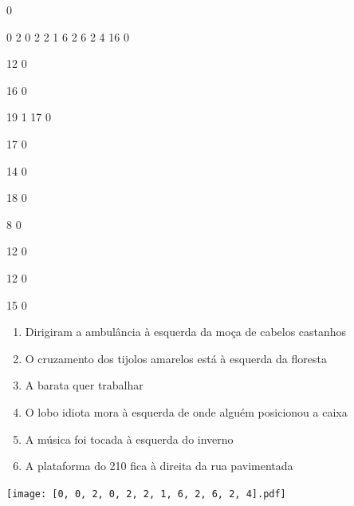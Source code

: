 \documentclass[12pt]{article}
\begin{document}
		\vfill  
		  
{
	0	%

	0	%
	2	%
	0	%
	2	%
	2	%
	1	%
	6	%
	2	%
	6	%
	2	%
	4	%
	16	%
	0	%

	12	%
	0	%

	16	%
	0	%

	19	%
	1	%
	17	%
	0	%

	17	%
	0	%

	14	%
	0	%

	18	%
	0	%

	8	%
	0	%

	12	%
	0	%

	12	%
	0	%

	15	%
	0	%

}	  
		    	

		 

\pagebreak


	\begin{enumerate}
		  \sffamily %
		  \large %


\vfill \item
Dirigiram a ambulância	%
à esquerda
da moça de cabelos castanhos	%

\vfill \item
O cruzamento dos tijolos amarelos está	%
à esquerda
da floresta	%

\vfill \item
A barata	%
quer trabalhar	%

\vfill \item
O lobo idiota mora	%
à esquerda
de onde alguém posicionou a caixa	%

\vfill \item
A música foi tocada	%
à esquerda
do inverno	%

\vfill \item
A plataforma do 210 fica	%
à direita
da rua pavimentada	%
	\end{enumerate}
		  
		  \hfill

		  \vfill

\texttt{[image: [0, 0, 2, 0, 2, 2, 1, 6, 2, 6, 2, 4].pdf]}
\end{document}
